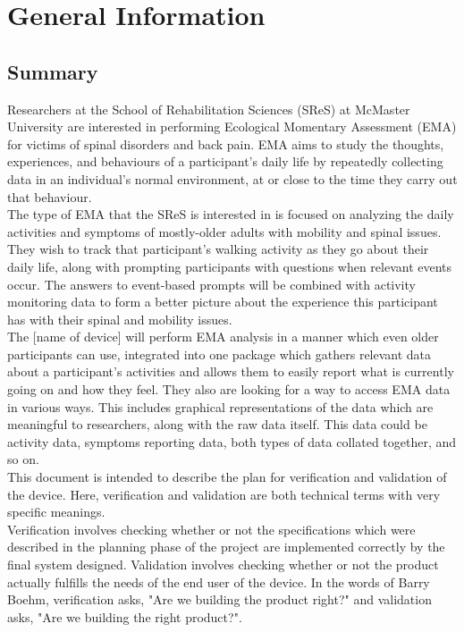\documentclass[12pt, titlepage]{article}
\begin{document}
\section{General Information}

\subsection{Summary}

Researchers at the School of Rehabilitation Sciences (SReS) at McMaster University are interested in performing Ecological Momentary Assessment (EMA) for victims of spinal disorders and back pain. EMA aims to study the thoughts, experiences, and behaviours of a participant's daily life by repeatedly collecting data in an individual's normal environment, at or close to the time they carry out that behaviour.\\

The type of EMA that the SReS is interested in is focused on analyzing the daily activities and symptoms of mostly-older adults with mobility and spinal issues. They wish to track that participant's walking activity as they go about their daily life, along with prompting participants with questions when relevant events occur. The answers to event-based prompts will be combined with activity monitoring data to form a better picture about the experience this participant has with their spinal and mobility issues.\\

The [name of device] will perform EMA analysis in a manner which even older participants can use, integrated into one package which gathers relevant data about a participant's activities and allows them to easily report what is currently going on and how they feel. They also are looking for a way to access EMA data in various ways. This includes graphical representations of the data which are meaningful to researchers, along with the raw data itself. This data could be activity data, symptoms reporting data, both types of data collated together, and so on. \\

This document is intended to describe the plan for verification and validation of the device. Here, verification and validation are both technical terms with very specific meanings.\\

Verification involves checking whether or not the specifications which were described in the planning phase of the project are implemented correctly by the final system designed. Validation involves checking whether or not the product actually fulfills the needs of the end user of the device. In the words of Barry Boehm, verification asks, "Are we building the product right?" and validation asks, "Are we building the right product?"\cite{pham_1999}.
\end{document}

